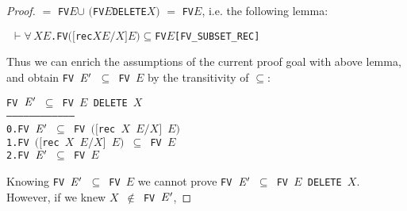 \documentclass[GCNS]{yincog}
\renewcommand{\HOLinline}[1]{\mbox{\textup{\texttt{#1}}}}
\renewcommand{\HOLConst}[1]{\texttt{#1}}
\renewcommand{\HOLBoundVar}[1]{\ensuremath{\mathit{#1}}}
\renewcommand{\HOLFreeVar}[1]{\ensuremath{\mathit{#1}}}
\renewcommand{\HOLSymConst}[1]{#1}
\renewcommand{\HOLTokenSubset}{\ensuremath{\subseteq}}
\renewcommand{\HOLTokenUnion}{\ensuremath{\cup}}
\renewcommand{\HOLTokenForall}{\ensuremath{\forall \,}}
\renewcommand{\HOLTokenNotIn}{\ensuremath{\notin}}
\renewcommand{\HOLTokenTurnstile}{\ensuremath{\:\:\vdash}}
\theoremstyle{remark}
\theoremstyle{theorem}
\theoremstyle{remark}
\begin{document}
\begin{proof}
$=$
\HOLinline{\HOLConst{FV}\\\;\HOLFreeVar{E}\\\;\HOLSymConst{\HOLTokenUnion{}}}\break
\HOLinline{\ensuremath{(}\HOLConst{FV}\\\;\HOLFreeVar{E}\\\;\HOLConst{DELETE}\\\;\HOLFreeVar{X}\ensuremath{)}}
$=$ \HOLinline{\HOLConst{FV}\\\;\HOLFreeVar{E}}, i.e. the following lemma:
%
\begin{alltt}
\HOLTokenTurnstile{} \HOLSymConst{\HOLTokenForall{}}\HOLBoundVar{X} \HOLBoundVar{E}. \HOLConst{FV} \ensuremath{(}\ensuremath{[}\HOLConst{rec} \HOLBoundVar{X} \HOLBoundVar{E}\ensuremath{/}\HOLBoundVar{X}\ensuremath{]} \HOLBoundVar{E}\ensuremath{)} \HOLSymConst{\HOLTokenSubset{}} \HOLConst{FV} \HOLBoundVar{E}\hfill{[FV\_SUBSET\_REC]}
\end{alltt}
%
Thus we can enrich the assumptions of the current proof goal with above
lemma, and obtain
\HOLinline{\HOLConst{FV} \ensuremath{\HOLFreeVar{E}\sp{\prime}} \HOLSymConst{\HOLTokenSubset{}} \HOLConst{FV} \HOLFreeVar{E}}
by the transitivity of $\subseteq $:
%
\begin{alltt}
        \HOLinline{\HOLConst{FV} \ensuremath{\HOLFreeVar{E}\sp{\prime}} \HOLSymConst{\HOLTokenSubset{}} \HOLConst{FV} \HOLFreeVar{E} \HOLConst{DELETE} \HOLFreeVar{X}}
   ------------------------------------
    0.  \HOLinline{\HOLConst{FV} \ensuremath{\HOLFreeVar{E}\sp{\prime}} \HOLSymConst{\HOLTokenSubset{}} \HOLConst{FV} \ensuremath{(}\ensuremath{[}\HOLConst{rec} \HOLFreeVar{X} \HOLFreeVar{E}\ensuremath{/}\HOLFreeVar{X}\ensuremath{]} \HOLFreeVar{E}\ensuremath{)}}
    1.  \HOLinline{\HOLConst{FV} \ensuremath{(}\ensuremath{[}\HOLConst{rec} \HOLFreeVar{X} \HOLFreeVar{E}\ensuremath{/}\HOLFreeVar{X}\ensuremath{]} \HOLFreeVar{E}\ensuremath{)} \HOLSymConst{\HOLTokenSubset{}} \HOLConst{FV} \HOLFreeVar{E}}
    2.  \HOLinline{\HOLConst{FV} \ensuremath{\HOLFreeVar{E}\sp{\prime}} \HOLSymConst{\HOLTokenSubset{}} \HOLConst{FV} \HOLFreeVar{E}}
\end{alltt}
%
Knowing
\HOLinline{\HOLConst{FV} \ensuremath{\HOLFreeVar{E}\sp{\prime}} \HOLSymConst{\HOLTokenSubset{}} \HOLConst{FV} \HOLFreeVar{E}}
we cannot prove
\HOLinline{\HOLConst{FV} \ensuremath{\HOLFreeVar{E}\sp{\prime}} \HOLSymConst{\HOLTokenSubset{}} \HOLConst{FV} \HOLFreeVar{E} \HOLConst{DELETE} \HOLFreeVar{X}}.
However, if we knew
\HOLinline{\HOLFreeVar{X} \HOLSymConst{\HOLTokenNotIn{}} \HOLConst{FV} \ensuremath{\HOLFreeVar{E}\sp{\prime}}},

\end{proof}
\end{document}
